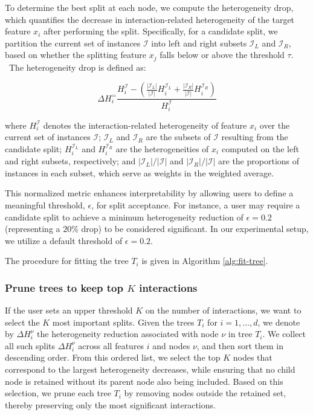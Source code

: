 To determine the best split at each node, we compute the heterogeneity drop, which quantifies the decrease in interaction-related heterogeneity of the target feature $x_i$ after performing the split. Specifically, for a candidate split, we partition the current set of instances $\mathcal{I}$ into left and right subsets $\mathcal{I}_L$ and $\mathcal{I}_R$,
based on whether the splitting feature $x_j$ falls below or above the threshold $\tau$. \
The heterogeneity drop is defined as:

\begin{equation}
\label{eq:heter-drop}
\Delta H_i^ = \frac{H_i^{\mathcal{I}} - \left ( \frac{|\mathcal{I}_L|}{|\mathcal{I}|}H_i^{\mathcal{I}_L} + \frac{|\mathcal{I}_R|}{|\mathcal{I}|}H_i^{\mathcal{I}_R}  \right )}{H_i^{\mathcal{I}}}
\end{equation}

where \(H_i^{\mathcal{I}}\) denotes the interaction-related heterogeneity of feature \(x_i\) over the current set of instances \(\mathcal{I}\); \(\mathcal{I}_L\) and \(\mathcal{I}_R\) are the subsets of \(\mathcal{I}\) resulting from the candidate split; \(H_i^{\mathcal{I}_L}\) and \(H_i^{\mathcal{I}_R}\) are the heterogeneities of \(x_i\) computed on the left and right subsets, respectively; and \(|\mathcal{I}_L| / |\mathcal{I}|\) and \(|\mathcal{I}_R| / |\mathcal{I}|\) are the proportions of instances in each subset, which serve as weights in the weighted average.

This normalized metric enhances interpretability by allowing users to define a meaningful threshold, $\epsilon$, for split acceptance. For instance, a user may require a candidate split to achieve a minimum heterogeneity reduction of $\epsilon = 0.2$ (representing a $20\%$ drop) to be considered significant. In our experimental setup, we utilize a default threshold of $\epsilon = 0.2$.

The procedure for fitting the tree $T_i$ is given in Algorithm \ref{alg:fit-tree}.

\subsubsection{Prune trees to keep top $K$ interactions}
\label{subsec:pruning}

If the user sets an upper threshold $K$ on the number of interactions, we want to select the $K$ most important splits.
Given the trees \(T_i\) for $i=1, \ldots, d$, we denote by \(\Delta H_i^\nu\) the heterogeneity reduction associated with node \(\nu\) in tree \(T_i\). We collect all such splits \(\Delta H_i^\nu\) across all features \(i\) and nodes \(\nu\), and then sort them in descending order.
From this ordered list, we select the top \(K\) nodes that correspond to the largest heterogeneity decreases, while ensuring that no child node is retained without its parent node also being included. Based on this selection, we prune each tree \(T_i\) by removing nodes outside the retained set, thereby preserving only the most significant interactions.

